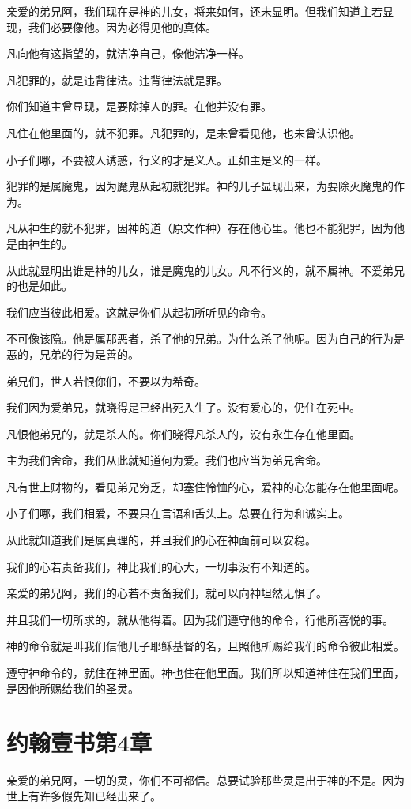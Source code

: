 \documentclass[12pt,oneside]{book}
\begin{document}
亲爱的弟兄阿，我们现在是神的儿女，将来如何，还未显明。但我们知道主若显现，我们必要像他。因为必得见他的真体。

凡向他有这指望的，就洁净自己，像他洁净一样。

凡犯罪的，就是违背律法。违背律法就是罪。

你们知道主曾显现，是要除掉人的罪。在他并没有罪。

凡住在他里面的，就不犯罪。凡犯罪的，是未曾看见他，也未曾认识他。

小子们哪，不要被人诱惑，行义的才是义人。正如主是义的一样。

犯罪的是属魔鬼，因为魔鬼从起初就犯罪。神的儿子显现出来，为要除灭魔鬼的作为。

凡从神生的就不犯罪，因神的道（原文作种）存在他心里。他也不能犯罪，因为他是由神生的。

从此就显明出谁是神的儿女，谁是魔鬼的儿女。凡不行义的，就不属神。不爱弟兄的也是如此。

我们应当彼此相爱。这就是你们从起初所听见的命令。

不可像该隐。他是属那恶者，杀了他的兄弟。为什么杀了他呢。因为自己的行为是恶的，兄弟的行为是善的。

弟兄们，世人若恨你们，不要以为希奇。

我们因为爱弟兄，就晓得是已经出死入生了。没有爱心的，仍住在死中。

凡恨他弟兄的，就是杀人的。你们晓得凡杀人的，没有永生存在他里面。

主为我们舍命，我们从此就知道何为爱。我们也应当为弟兄舍命。

凡有世上财物的，看见弟兄穷乏，却塞住怜恤的心，爱神的心怎能存在他里面呢。

小子们哪，我们相爱，不要只在言语和舌头上。总要在行为和诚实上。

从此就知道我们是属真理的，并且我们的心在神面前可以安稳。

我们的心若责备我们，神比我们的心大，一切事没有不知道的。

亲爱的弟兄阿，我们的心若不责备我们，就可以向神坦然无惧了。

并且我们一切所求的，就从他得着。因为我们遵守他的命令，行他所喜悦的事。

神的命令就是叫我们信他儿子耶稣基督的名，且照他所赐给我们的命令彼此相爱。

遵守神命令的，就住在神里面。神也住在他里面。我们所以知道神住在我们里面，是因他所赐给我们的圣灵。

\chapter{约翰壹书第4章}
亲爱的弟兄阿，一切的灵，你们不可都信。总要试验那些灵是出于神的不是。因为世上有许多假先知已经出来了。
\end{document}
